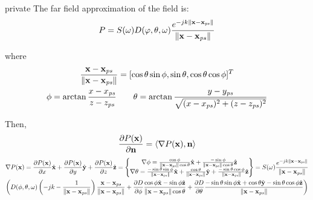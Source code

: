 \begin{shownto}{private}
The far field approximation of the field is:
\begin{equation}
P = S(\omega) D(\varphi, \theta, \omega) \GreenFunc[{\PosTheo - \PosTheo[primarySource]}]
\end{equation}

where
\begin{gather}
	\frac{\PosTheo - \PosTheo[primarySource]}{\norm{\PosTheo - \PosTheo[primarySource]}} = [\cos{\elevation} \sin\azimuth, \sin\elevation, \cos\elevation \cos\azimuth]^T \\
	\azimuth = \arctan \frac{x - x_{\PosTheoSubInd[primarySource]}}{z - z_{\PosTheoSubInd[primarySource]}} \qquad \elevation = \arctan{\frac{y - y_{\PosTheoSubInd[primarySource]}}{\sqrt{(x - x_{\PosTheoSubInd[primarySource]})^2 + (z - z_{\PosTheoSubInd[primarySource]})^2}}} 
\end{gather}

Then,
\begin{equation}
\frac{\partial P(\PosTheo)}{\partial \mathbf{n}} = \langle \nabla P(\PosTheo), \vec{n} \rangle
\end{equation}
\begin{multline}
	\nabla P(\PosTheo) = \frac{\partial P(\PosTheo)}{\partial x} \hat{\vec{x}} + \frac{\partial P(\PosTheo)}{\partial y} \hat{\vec{y}} + \frac{\partial P(\PosTheo)}{\partial z} \hat{\vec{z}} =
	\left\{ \begin{matrix}
		\nabla \azimuth = \frac{\cos\azimuth}{\norm{\PosTheo - \PosTheo[primarySource]} \cos \elevation} \hat{\vec{x}} +
		\frac{-\sin \azimuth}{\norm{\PosTheo - \PosTheo[primarySource]} \cos \elevation} \hat{\vec{z}} \\
		\nabla \elevation = \frac{-\sin \elevation \sin \azimuth}{\norm{\PosTheo - \PosTheo[primarySource]}} \hat{\vec{x}} + \frac{\cos \elevation}{\norm{\PosTheo - \PosTheo[primarySource]}} \hat{\vec{y}} + \frac{-\sin \elevation \cos \azimuth}{\norm{\PosTheo - \PosTheo[primarySource]}} \hat{\vec{z}}
	\end{matrix} \right\}
	= S(\omega) \GreenFunc[{\PosTheo - \PosTheo[primarySource]}]
	\\ \left(D(\azimuth, \elevation, \omega)
	\left(-jk - \frac{1}{\norm{\PosTheo - \PosTheo[primarySource]}}\right) \frac{\PosTheo - \PosTheo[primarySource]}{\norm{\PosTheo - \PosTheo[primarySource]}} +
	\frac{\partial D}{\partial \azimuth} \frac{\cos \azimuth \hat{\vec{x}} - \sin \azimuth \hat{\vec{z}}}{\norm{\PosTheo - \PosTheo[primarySource]} \cos \elevation} + \frac{\partial D}{\partial \elevation} \frac{-\sin\elevation \sin\azimuth \hat{\vec{x}} + \cos\elevation \hat{\vec{y}} - \sin\elevation \cos\azimuth \hat{\vec{z}}}{\norm{\PosTheo - \PosTheo[primarySource]}} \right)
\end{multline}


\end{shownto}
